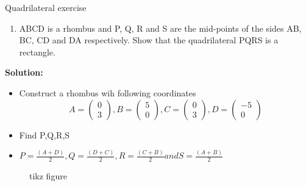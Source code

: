 \begin{frame}{Quadrilateral exercise}
\begin{enumerate}
\conti
\item ABCD is a rhombus and P, Q, R and S are the
mid-points of the sides AB, BC, CD and DA
respectively. Show that the quadrilateral PQRS
is a rectangle.
\seti
\end{enumerate}
\textbf{Solution:}
\begin{itemize}
\item Construct a rhombus wih following coordinates $$A=\begin{pmatrix}
0 \\3 
\end{pmatrix},
B=\begin{pmatrix}
5 \\0 
\end{pmatrix},
C=\begin{pmatrix}
0 \\3
\end{pmatrix},
D=\begin{pmatrix}
-5 \\0 
\end{pmatrix}$$
\item Find P,Q,R,S
\item $P=\frac{(A+D)}{2},Q=\frac{(D+C)}{2},R=\frac{(C+B)}{2} and S=\frac{(A+B)}{2}$
\end{itemize}
\end{frame}
\begin{frame}
\begin{figure}[!h]
\resizebox{0.5\linewidth}{!}
{


}
\caption{tikz figure}
\label{fig:foo}
\end{figure}
\end{frame}
